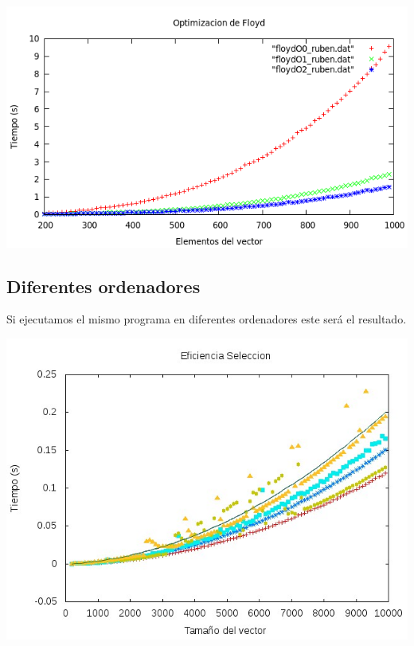\documentclass[11pt,spanish]{article} %
\begin{document}
\begin{center}
\includegraphics[scale=0.55]{../Graficas/Floyd/floyd_optimizacion.png}
\end{center}

\subsection{Diferentes ordenadores}
Si ejecutamos el mismo programa en diferentes ordenadores este será el resultado.

\begin{center}
\includegraphics[scale=0.55]{../Graficas/Seleccion/total_Seleccion.jpeg}
\end{center}	
\end{document}
